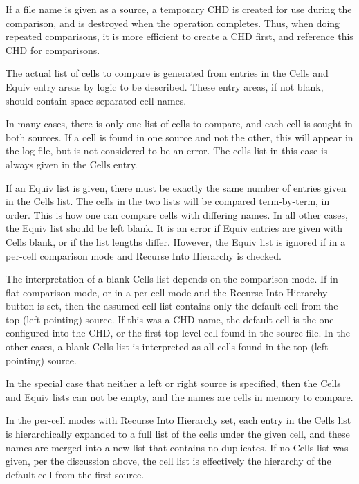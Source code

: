 If a file name is given as a source, a temporary CHD is created for
use during the comparison, and is destroyed when the operation
completes.  Thus, when doing repeated comparisons, it is more
efficient to create a CHD first, and reference this CHD for
comparisons.

The actual list of cells to compare is generated from entries in the
{\cb Cells} and {\cb Equiv} entry areas by logic to be described. 
These entry areas, if not blank, should contain space-separated cell
names.

In many cases, there is only one list of cells to compare, and each
cell is sought in both sources.  If a cell is found in one source and
not the other, this will appear in the log file, but is not considered
to be an error.  The cells list in this case is always given in the
{\cb Cells} entry.

If an {\cb Equiv} list is given, there must be exactly the same number
of entries given in the {\cb Cells} list.  The cells in the two lists
will be compared term-by-term, in order.  This is how one can compare
cells with differing names.  In all other cases, the {\cb Equiv} list
should be left blank.  It is an error if {\cb Equiv} entries are given
with {\cb Cells} blank, or if the list lengths differ.  However, the
{\cb Equiv} list is ignored if in a per-cell comparison mode and {\cb
Recurse Into Hierarchy} is checked.

The interpretation of a blank {\cb Cells} list depends on the
comparison mode.  If in flat comparison mode, or in a per-cell mode
and the {\cb Recurse Into Hierarchy} button is set, then the assumed
cell list contains only the default cell from the top (left pointing)
source.  If this was a CHD name, the default cell is the one
configured into the CHD, or the first top-level cell found in the
source file.  In the other cases, a blank {\cb Cells} list is
interpreted as all cells found in the top (left pointing) source.

In the special case that neither a left or right source is specified,
then the {\cb Cells} and {\cb Equiv} lists can not be empty, and the
names are cells in memory to compare.

In the per-cell modes with {\cb Recurse Into Hierarchy} set, each
entry in the {\cb Cells} list is hierarchically expanded to a full
list of the cells under the given cell, and these names are merged
into a new list that contains no duplicates.  If no {\cb Cells} list
was given, per the discussion above, the cell list is effectively the
hierarchy of the default cell from the first source.

